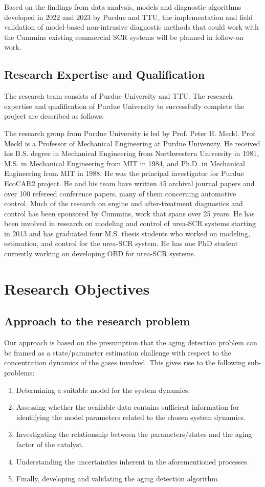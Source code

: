 \documentclass[letterpaper, 11pt]{article}
\begin{document}
Based on the findings from data analysis, models and diagnostic algorithms
developed in 2022 and 2023 by Purdue and TTU, the implementation and field
validation of model-based non-intrusive diagnostic methods that could work with
the Cummins existing commercial SCR systems will be planned in follow-on work.

\subsection{Research Expertise and Qualification}
The research team consists of Purdue University and TTU. The research expertise and qualification of Purdue University to successfully complete the project are described as follows:

The research group from Purdue University is led by Prof. Peter H. Meckl. Prof.
Meckl is a Professor of Mechanical Engineering at Purdue University. He received
his B.S. degree in Mechanical Engineering from Northwestern University in 1981,
M.S. in Mechanical Engineering from MIT in 1984, and Ph.D. in Mechanical
Engineering from MIT in 1988. He was the principal investigator for Purdue
EcoCAR2 project. He and his team have written 45 archival journal papers and
over 100 refereed conference papers, many of them concerning automotive control.
Much of the research on engine and after-treatment diagnostics and control has
been sponsored by Cummins, work that spans over 25 years. He has been involved
in research on modeling and control of urea-SCR systems starting in 2013 and has
graduated four M.S. thesis students who worked on modeling, estimation, and
control for the urea-SCR system. He has one PhD student currently
working on developing OBD for urea-SCR systems.


\section{Research Objectives}
\subsection{Approach to the research problem}
Our approach is based on the presumption that the aging detection problem can be framed as a state/parameter estimation challenge with respect to the concentration dynamics of the gases involved. This gives rise to the following sub-problems:

\begin{enumerate}
\item Determining a suitable model for the system dynamics.
\item Assessing whether the available data contains sufficient information for identifying the model parameters related to the chosen system dynamics.
\item Investigating the relationship between the parameters/states and the aging factor of the catalyst.
\item Understanding the uncertainties inherent in the aforementioned processes.
\item Finally, developing and validating the aging detection algorithm.
\end{enumerate}
\end{document}
